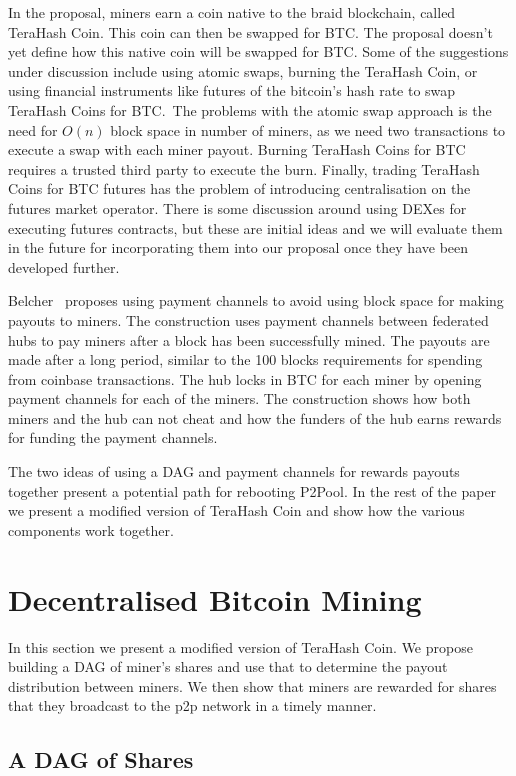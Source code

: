 \documentclass{article}
\begin{document}
In the proposal, miners earn a coin native to the braid blockchain,
called TeraHash Coin. This coin can then be swapped for BTC. The
proposal doesn't yet define how this native coin will be swapped for
BTC. Some of the suggestions under discussion include using atomic
swaps, burning the TeraHash Coin, or using financial instruments like
futures of the bitcoin's hash rate to swap TeraHash Coins for BTC.\
The problems with the atomic swap approach is the need for $O(n)$
block space in number of miners, as we need two transactions to
execute a swap with each miner payout. Burning TeraHash Coins for BTC
requires a trusted third party to execute the burn. Finally, trading
TeraHash Coins for BTC futures has the problem of introducing
centralisation on the futures market operator. There is some
discussion around using DEXes for executing futures contracts, but
these are initial ideas and we will evaluate them in the future for
incorporating them into our proposal once they have been developed
further.

Belcher~\cite{channels-for-rewards} proposes using payment channels to
avoid using block space for making payouts to miners. The construction
uses payment channels between federated hubs to pay miners after a
block has been successfully mined. The payouts are made after a long
period, similar to the 100 blocks requirements for spending from
coinbase transactions. The hub locks in BTC for each miner by opening
payment channels for each of the miners. The construction shows how
both miners and the hub can not cheat and how the funders of the hub
earns rewards for funding the payment channels.

The two ideas of using a DAG and payment channels for rewards
payouts together present a potential path for rebooting P2Pool. In the
rest of the paper we present a modified version of TeraHash Coin and
show how the various components work together.

\section{Decentralised Bitcoin Mining}

In this section we present a modified version of TeraHash Coin. We
propose building a DAG of miner's shares and use that to determine the
payout distribution between miners. We then show that miners are
rewarded for shares that they broadcast to the p2p network in a timely
manner.

\subsection{A DAG of Shares}
\end{document}
